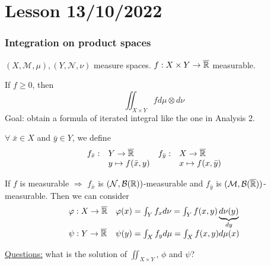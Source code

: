 \section{Lesson 13/10/2022}
\subsubsection*{Integration on product spaces}
\((X, \mathcal{M}, \mu), (Y, \mathcal{N},\nu)\) measure spaces. \(f : X \times Y \to \overline{\mathbb{R}}\) measurable.

If \(f \geq 0\), then 
\[
    \iint_{X \times Y} f d\mu\otimes d\nu
\]
Goal: obtain a formula of iterated integral like the one in Analysis 2.

\(\forall \; \bar{x} \in X\) and \(\bar{y} \in Y\), we define
\[
    \begin{array}{llll}
        f_{\bar{x}} :& Y \to \overline{\mathbb{R}} & f_{\bar{y}}:& X \to \overline{\mathbb{R}}  \\
        & y \mapsto f(\bar{x}, y) & & x \mapsto f(x, \bar{y})

    \end{array}
\]
\begin{proposition}
    If \(f\) is measurable \(\Rightarrow\) \(f_{\bar{x}}\) is \((\mathcal{N}, \mathcal{B}(\mathbb{R}))\)-measurable and \(f_{\bar{y}}\) is \((\mathcal{M}, \mathcal{B}(\overline{\mathbb{R}}))\)-measurable.
    Then we can consider
    \[
        \begin{array}{ll}    
        \varphi : X \to \overline{\mathbb{R}} & 
        \varphi(x) = \int_Y f_x d\nu = \int_Y f(x,y) \underbrace{d\nu(y)}_{dy} \\
        \psi : Y \to \overline{\mathbb{R}} &
        \psi(y) = \int_X f_y d\mu = \int_X f(x,y) d\mu(x)
    \end{array}
    \]
\end{proposition}
\underline{Questions:} what is the solution of \(\iint_{X \times Y}\), \(\phi\) and \(\psi\)?


